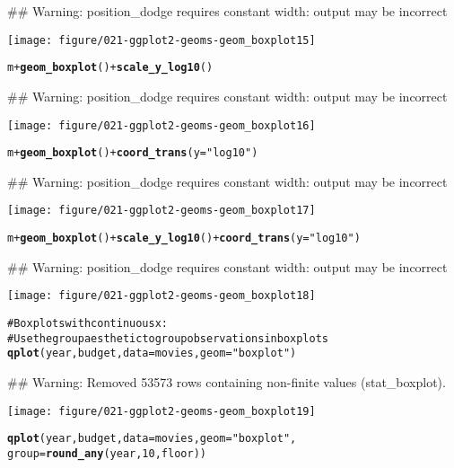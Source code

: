 \documentclass[a4paper,titlepage]{tufte-handout}\usepackage{graphicx, color}
\makeatletter
\def\maxwidth{ %
  \ifdim\Gin@nat@width>\linewidth
    \linewidth
  \else
    \Gin@nat@width
  \fi
}
\newcommand{\hlfunctioncall}[1]{\textcolor[rgb]{0.501960784313725,0,0.329411764705882}{\textbf{#1}}}%
\newcommand{\hlstring}[1]{\textcolor[rgb]{0.6,0.6,1}{#1}}%
\newcommand{\hlcomment}[1]{\textcolor[rgb]{0.180392156862745,0.6,0.341176470588235}{#1}}%
\newenvironment{kframe}{%
 \def\at@end@of@kframe{}%
 \ifinner\ifhmode%
  \def\at@end@of@kframe{\end{minipage}}%
  \begin{minipage}{\columnwidth}%
 \fi\fi%
 \def\FrameCommand##1{\hskip\@totalleftmargin \hskip-\fboxsep
 \colorbox{shadecolor}{##1}\hskip-\fboxsep
     \hskip-\linewidth \hskip-\@totalleftmargin \hskip\columnwidth}%
 \MakeFramed {\advance\hsize-\width
   \@totalleftmargin\z@ \linewidth\hsize
   \@setminipage}}%
 {\par\unskip\endMakeFramed%
 \at@end@of@kframe}
\newenvironment{knitrout}{}{} %
\makeatother
\begin{document}
\begin{knitrout}
\begin{kframe}
{\ttfamily\noindent\textcolor{warningcolor}{\#\# Warning: position\_dodge requires constant width: output may be incorrect}}\end{kframe}
\texttt{[image: figure/021-ggplot2-geoms-geom\_boxplot15]} 
\begin{kframe}\begin{alltt}
m + \hlfunctioncall{geom_boxplot}() + \hlfunctioncall{scale_y_log10}()
\end{alltt}


{\ttfamily\noindent\textcolor{warningcolor}{\#\# Warning: position\_dodge requires constant width: output may be incorrect}}\end{kframe}
\texttt{[image: figure/021-ggplot2-geoms-geom\_boxplot16]} 
\begin{kframe}\begin{alltt}
m + \hlfunctioncall{geom_boxplot}() + \hlfunctioncall{coord_trans}(y = \hlstring{"log10"})
\end{alltt}


{\ttfamily\noindent\textcolor{warningcolor}{\#\# Warning: position\_dodge requires constant width: output may be incorrect}}\end{kframe}
\texttt{[image: figure/021-ggplot2-geoms-geom\_boxplot17]} 
\begin{kframe}\begin{alltt}
m + \hlfunctioncall{geom_boxplot}() + \hlfunctioncall{scale_y_log10}() + \hlfunctioncall{coord_trans}(y = \hlstring{"log10"})
\end{alltt}


{\ttfamily\noindent\textcolor{warningcolor}{\#\# Warning: position\_dodge requires constant width: output may be incorrect}}\end{kframe}
\texttt{[image: figure/021-ggplot2-geoms-geom\_boxplot18]} 
\begin{kframe}\begin{alltt}

\hlcomment{# Boxplots with continuous x:}
\hlcomment{# Use the group aesthetic to group observations in boxplots}
\hlfunctioncall{qplot}(year, budget, data = movies, geom = \hlstring{"boxplot"})
\end{alltt}


{\ttfamily\noindent\textcolor{warningcolor}{\#\# Warning: Removed 53573 rows containing non-finite values (stat\_boxplot).}}\end{kframe}
\texttt{[image: figure/021-ggplot2-geoms-geom\_boxplot19]} 
\begin{kframe}\begin{alltt}
\hlfunctioncall{qplot}(year, budget, data = movies, geom = \hlstring{"boxplot"},
  group = \hlfunctioncall{round_any}(year, 10, floor))
\end{alltt}



\end{kframe}
\end{knitrout}
\end{document}
